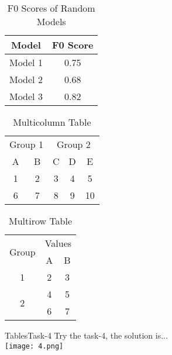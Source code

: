 \begin{frame}
\begin{table}[htbp]
\centering
\caption{F0 Scores of Random Models}
\begin{tabular}{cc}
\toprule
Model & F0 Score \\
\midrule
Model 1 & 0.75 \\
Model 2 & 0.68 \\
Model 3 & 0.82 \\
\bottomrule
\end{tabular}
\end{table}
\end{frame}

\begin{frame}
\begin{table}[htbp]
\centering
\caption{Multicolumn Table}
\begin{tabular}{ccccc}
\toprule
\multicolumn{2}{c}{Group 1} & \multicolumn{3}{c}{Group 2} \\
\cmidrule(r){1-2} \cmidrule(l){3-5}
A & B & C & D & E \\
\midrule
1 & 2 & 3 & 4 & 5 \\
6 & 7 & 8 & 9 & 10 \\
\bottomrule
\end{tabular}
\end{table}


\end{frame}
\begin{table}[htbp]
\centering
\caption{Multirow Table}
\begin{tabular}{ccc}
\toprule
\multirow{2}{*}{Group} & \multicolumn{2}{c}{Values} \\
\cmidrule(r){2-3}
 & A & B \\
\midrule
1 & 2 & 3 \\
\midrule
\multirow{2}{*}{2} & \multicolumn{1}{c}{4} & \multicolumn{1}{c}{5} \\
 & 6 & 7 \\
\bottomrule
\end{tabular}
\end{table}
\begin{frame}

\end{frame}
\begin{frame}{Tables}{Task-4}
    Try the task-4, the solution is...\\ \pause
    \vspace{1em}
    \texttt{[image: 4.png]}
\end{frame}

